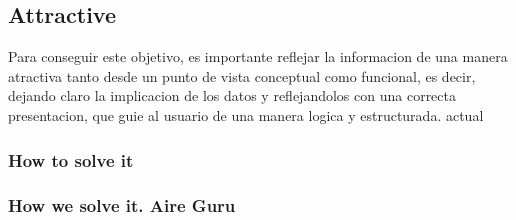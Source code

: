 \subsection{Attractive}
Para conseguir este objetivo, es importante reflejar la informacion de una manera atractiva tanto desde un punto de vista conceptual como funcional, 
es decir, dejando claro la implicacion de los datos y reflejandolos con una correcta presentacion, que guie al usuario de una manera logica y estructurada.
actual
\subsubsection{How to solve it} 


\subsubsection{How we solve it. Aire Guru} 
 
\begin{itemize}
    \done
    \crossed
    
\end{itemize}
\newpage